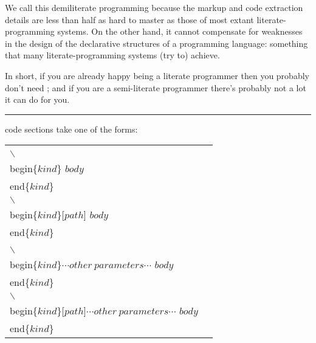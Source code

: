 \documentclass[a4paper]{article}
\def\L#1{\raisebox{-.5ex}{#1}}
\def\R#1{\raisebox{.5ex}{#1}}
\def\RR#1{\raisebox{1ex}{#1}}
\def\TexTract{\RR{\begin{turn}{-10}\textsc{\textsf{\textbf{T\L{e}X\R{T}r\L{a}c\R{T}}}}\end{turn}}\xspace}
\def\xxxxx{\begin{center}{\rule{4in}{0.01in}}\end{center}}
\begin{document}
We call this demiliterate programming because the markup and code
extraction details are less than half as hard to master as those
of most extant literate-program\-ming systems. On the other hand, it
cannot compensate for weaknesses in the design of the declarative
structures of a  programming language: something that many
literate-programming systems (try to) achieve. 

In short, if you are already happy being a literate programmer then
you probably don't need \TexTract; and if you are a semi-literate
programmer there's probably not a lot it can do for
you.

\xxxxx

\TexTract code sections take one of the forms:

\begin{center}
\begin{tabular}{ll}

\begin{minipage}{1.5in}
\def\\{\(\backslash\)}
\begin{alltt}
\\begin\{\(kind\)\}
   \(body\)
\\end\{\(kind\)\}
\end{alltt}
\end{minipage}

&

\begin{minipage}{1.5in}
\def\\{\(\backslash\)}
\begin{alltt}
\\begin\{\(kind\)\}[\(path\)]
   \(body\)
\\end\{\(kind\)\}
\end{alltt}
\end{minipage}

\\[5ex]

\begin{minipage}{1.9in}
\def\\{\(\backslash\)}
\begin{alltt}
\\begin\{\(kind\)\}\(\cdots{}other\ parameters\cdots\)
   \(body\)
\\end\{\(kind\)\}
\end{alltt}
\end{minipage}

&

\begin{minipage}{1.9in}
\def\\{\(\backslash\)}
\begin{alltt}
\\begin\{\(kind\)\}[\(path\)]\(\cdots{}other\ parameters\cdots\)
   \(body\)
\\end\{\(kind\)\}
\end{alltt}
\end{minipage}

\end{tabular}
\end{center}
\end{document}
